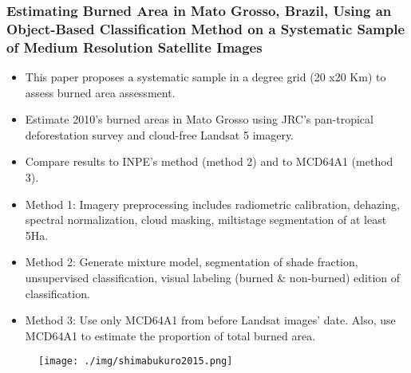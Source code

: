 \documentclass{beamer}
\begin{document}
\begin{frame}[t, allowframebreaks]
    \frametitle{Estimating Burned Area in Mato Grosso, Brazil, Using an 
    Object-Based Classification Method on a Systematic Sample of Medium 
    Resolution Satellite Images~\cite{shimabukuro2015}}
    \begin{itemize}
        \item This paper proposes a systematic sample in a degree grid (20 x20 
            Km) to assess burned area assessment.
        \item Estimate 2010's burned areas in Mato Grosso using JRC's 
            pan-tropical deforestation survey and cloud-free Landsat 5 imagery.
        \item Compare results to INPE's method (method 2) and to MCD64A1 
            (method 3).
        \item Method 1: Imagery preprocessing includes radiometric calibration, 
            dehazing, spectral normalization, cloud masking, miltistage 
            segmentation of at least 5Ha.
        \item Method 2: Generate mixture model, segmentation of shade fraction,
            unsupervised classification, visual labeling (burned \& non-burned)
            edition of classification.
        \item Method 3: Use only MCD64A1 from before Landsat images' date. 
            Also, use MCD64A1 to estimate the proportion of total burned area. 
    \end{itemize}
    \begin{figure}
        \centering
        \texttt{[image: ./img/shimabukuro2015.png]}
    \end{figure}
\end{frame}
\end{document}
